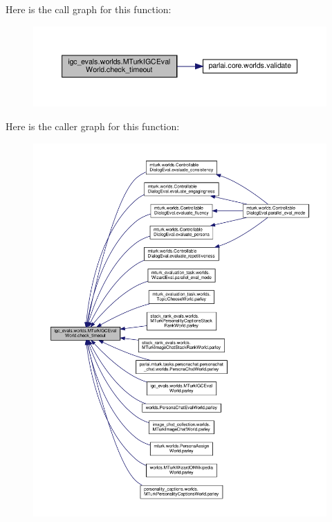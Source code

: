 Here is the call graph for this function\+:
\nopagebreak
\begin{figure}[H]
\begin{center}
\leavevmode
\includegraphics[width=350pt]{classigc__evals_1_1worlds_1_1MTurkIGCEvalWorld_a75c18798b76fb6e3a7b5b74b31de3d55_cgraph}
\end{center}
\end{figure}
Here is the caller graph for this function\+:
\nopagebreak
\begin{figure}[H]
\begin{center}
\leavevmode
\includegraphics[width=350pt]{classigc__evals_1_1worlds_1_1MTurkIGCEvalWorld_a75c18798b76fb6e3a7b5b74b31de3d55_icgraph}
\end{center}
\end{figure}
\mbox{\label{classigc__evals_1_1worlds_1_1MTurkIGCEvalWorld_a8c3a8c5efdefb5a5475f3290358c2e86}} 
